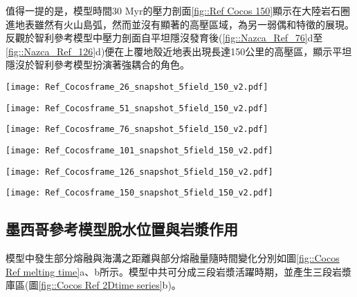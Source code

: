 值得一提的是，模型時間30 Myr的壓力剖面\ref{fig::Ref Cocos 150}顯示在大陸岩石圈進地表雖然有火山島弧，然而並沒有顯著的高壓區域，為另一弱偶和特徵的展現。
反觀於智利參考模型中壓力剖面自平坦隱沒發育後(\ref{fig::Nazca_Ref_76}d至\ref{fig::Nazca_Ref_126}d)便在上覆地殼近地表出現長達150公里的高壓區，顯示平坦隱沒於智利參考模型扮演著強耦合的角色。

\begin{figure*}[htp]
    \centering
    \texttt{[image: Ref\_Cocosframe\_26\_snapshot\_5field\_150\_v2.pdf]}
    \caption[墨西哥參考模型於5 Myr時之結果]{墨西哥參考模型於5 Myr時之結果。}
    \label{fig::Ref Cocos 26}
\end{figure*}

\begin{figure*}[htp]
    \centering
    \texttt{[image: Ref\_Cocosframe\_51\_snapshot\_5field\_150\_v2.pdf]}
    \caption[墨西哥參考模型於10 Myr時之結果]{墨西哥參考模型於10 Myr時之結果。}
    \label{fig::Ref Cocos 51}
\end{figure*}

\begin{figure*}[htp]
    \centering
    \texttt{[image: Ref\_Cocosframe\_76\_snapshot\_5field\_150\_v2.pdf]}
    \caption[墨西哥參考模型於15 Myr時之結果]{墨西哥參考模型於15 Myr時之結果。}
    \label{fig::Ref Cocos 76}
\end{figure*}

\begin{figure*}[htp]
    \centering
    \texttt{[image: Ref\_Cocosframe\_101\_snapshot\_5field\_150\_v2.pdf]}
    \caption[墨西哥參考模型於20 Myr時之結果]{墨西哥參考模型於20 Myr時之結果。}
    \label{fig::Ref Cocos 101}
\end{figure*}

\begin{figure*}[htp]
    \centering
    \texttt{[image: Ref\_Cocosframe\_126\_snapshot\_5field\_150\_v2.pdf]}
    \caption[墨西哥參考模型於25 Myr時之結果]{墨西哥參考模型於25 Myr時之結果。}
    \label{fig::Ref Cocos 126}
\end{figure*}

\begin{figure*}[htp]
    \centering
    \texttt{[image: Ref\_Cocosframe\_150\_snapshot\_5field\_150\_v2.pdf]}
    \caption[墨西哥參考模型於30 Myr時之結果]{墨西哥參考模型於30 Myr時之結果。}
    \label{fig::Ref Cocos 150}
\end{figure*}

\newpage
\subsection{墨西哥參考模型脫水位置與岩漿作用}\label{墨西哥參考模型脫水位置與岩漿作用}
模型中發生部分熔融與海溝之距離與部分熔融量隨時間變化分別如圖\ref{fig::Cocos Ref melting time}a、b所示。模型中共可分成三段岩漿活躍時期，並產生三段岩漿庫區(圖\ref{fig::Cocos Ref 2Dtime series}b)。

